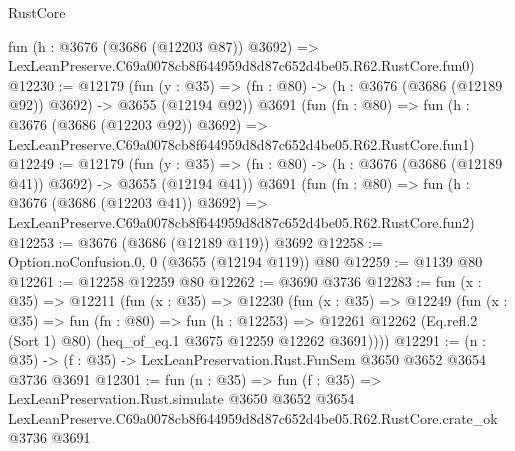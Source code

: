 \begin{lexlean}{RustCore}
\begin{coremodule}
    fun (h : @3676 (@3686 (@12203 @87)) @3692) =>
    LexLeanPreserve.C69a0078cb8f644959d8d87c652d4be05.R62.RustCore.fun0)
@12230 := @12179
    (fun (y : @35) => (fn : @80) -> (h : @3676 (@3686 (@12189 @92)) @3692) -> @3655 (@12194 @92))
    @3691
    (fun (fn : @80) =>
    fun (h : @3676 (@3686 (@12203 @92)) @3692) =>
    LexLeanPreserve.C69a0078cb8f644959d8d87c652d4be05.R62.RustCore.fun1)
@12249 := @12179
    (fun (y : @35) => (fn : @80) -> (h : @3676 (@3686 (@12189 @41)) @3692) -> @3655 (@12194 @41))
    @3691
    (fun (fn : @80) =>
    fun (h : @3676 (@3686 (@12203 @41)) @3692) =>
    LexLeanPreserve.C69a0078cb8f644959d8d87c652d4be05.R62.RustCore.fun2)
@12253 := @3676 (@3686 (@12189 @119)) @3692
@12258 := Option.noConfusion.{0, 0} (@3655 (@12194 @119)) @80
@12259 := @1139 @80
@12261 := @12258 @12259 @80
@12262 := @3690 @3736
@12283 := fun (x : @35) =>
  @12211
    (fun (x : @35) =>
    @12230
      (fun (x : @35) =>
      @12249
        (fun (x : @35) =>
        fun (fn : @80) =>
        fun (h : @12253) =>
        @12261 @12262 (Eq.refl.{2} (Sort 1) @80) (heq_of_eq.{1} @3675 @12259 @12262 @3691))))
@12291 := (n : @35) -> (f : @35) -> LexLeanPreservation.Rust.FunSem @3650 @3652 @3654 @3736 @3691
@12301 := fun (n : @35) =>
  fun (f : @35) =>
  LexLeanPreservation.Rust.simulate
    @3650
    @3652
    @3654
    LexLeanPreserve.C69a0078cb8f644959d8d87c652d4be05.R62.RustCore.crate_ok
    @3736
    @3691
\end{coremodule}
\end{lexlean}
